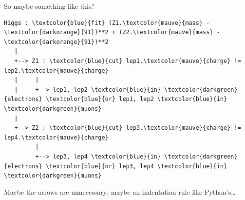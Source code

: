 \documentclass[aspectratio=169]{beamer}
\begin{document}
\begin{frame}[fragile]{So maybe something like this?}
\begin{Verbatim}[commandchars=\\\{\}]
Higgs : \textcolor{blue}{fit} (Z1.\textcolor{mauve}{mass} - \textcolor{darkorange}{91})**2 + (Z2.\textcolor{mauve}{mass} - \textcolor{darkorange}{91})**2
   |
   +--> Z1 : \textcolor{blue}{cut} lep1.\textcolor{mauve}{charge} != lep2.\textcolor{mauve}{charge}
   |     |
   |     +--> lep1, lep2 \textcolor{blue}{in} \textcolor{darkgreen}{electrons} \textcolor{blue}{or} lep1, lep2 \textcolor{blue}{in} \textcolor{darkgreen}{muons}
   |
   +--> Z2 : \textcolor{blue}{cut} lep3.\textcolor{mauve}{charge} != lep4.\textcolor{mauve}{charge}
         |
         +--> lep3, lep4 \textcolor{blue}{in} \textcolor{darkgreen}{electrons} \textcolor{blue}{or} lep3, lep4 \textcolor{blue}{in} \textcolor{darkgreen}{muons}
\end{Verbatim}

\large
\vspace{0.5 cm}
Maybe the arrows are unnecessary; maybe an indentation rule like Python's\ldots
\end{frame}
\end{document}
